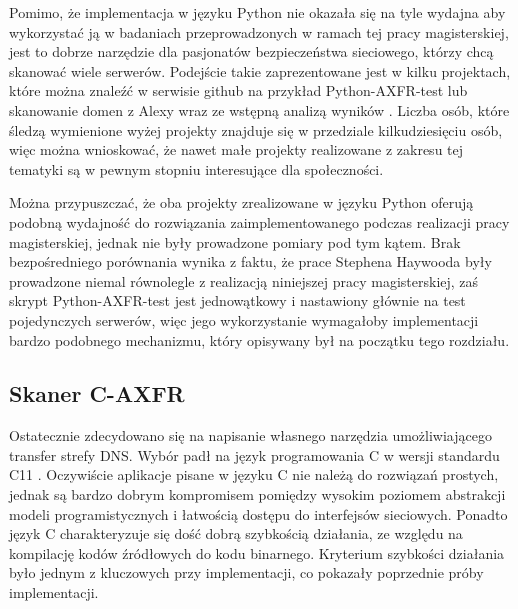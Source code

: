 Pomimo, że implementacja w języku Python nie okazała się na tyle wydajna aby wykorzystać ją w badaniach przeprowadzonych w
ramach tej pracy magisterskiej, jest to dobrze narzędzie dla pasjonatów bezpieczeństwa sieciowego, którzy chcą skanować wiele
serwerów. Podejście takie zaprezentowane jest w kilku projektach, które można znaleźć w serwisie github na przykład
Python-AXFR-test \cite{python_axfr_test} lub skanowanie domen z Alexy wraz ze wstępną analizą wyników \cite{asg-axfr}. Liczba osób,
które śledzą wymienione wyżej projekty znajduje się w przedziale kilkudziesięciu osób, więc można wnioskować, że nawet małe
projekty realizowane z zakresu tej tematyki są w pewnym stopniu interesujące dla społeczności. 

Można przypuszczać, że oba projekty zrealizowane w języku Python \cite{python_axfr_test, asg-axfr} oferują podobną wydajność do
rozwiązania zaimplementowanego podczas realizacji pracy magisterskiej, jednak nie były prowadzone pomiary pod tym kątem. Brak
bezpośredniego porównania wynika z faktu, że prace Stephena Haywooda \cite{asg-axfr} były prowadzone niemal równolegle z realizacją
niniejszej pracy magisterskiej, zaś skrypt Python-AXFR-test \cite{python_axfr_test} jest jednowątkowy i nastawiony głównie na test
pojedynczych serwerów, więc jego wykorzystanie wymagałoby implementacji bardzo podobnego mechanizmu, który opisywany był na
początku tego rozdziału.

\subsection{Skaner C-AXFR}
Ostatecznie zdecydowano się na napisanie własnego narzędzia umożliwiającego transfer strefy DNS. Wybór padł na język
programowania C \cite{Kernighan:1988:CPL:576122} w wersji standardu C11 \cite{ISO9899}. Oczywiście aplikacje pisane w języku
C nie należą do rozwiązań prostych, jednak są bardzo dobrym kompromisem pomiędzy wysokim poziomem abstrakcji modeli programistycznych
i łatwością dostępu do interfejsów sieciowych. Ponadto język C charakteryzuje się dość dobrą szybkością działania, ze względu na
kompilację kodów źródłowych do kodu binarnego. Kryterium szybkości działania było jednym z kluczowych przy implementacji, co
pokazały poprzednie próby implementacji.

